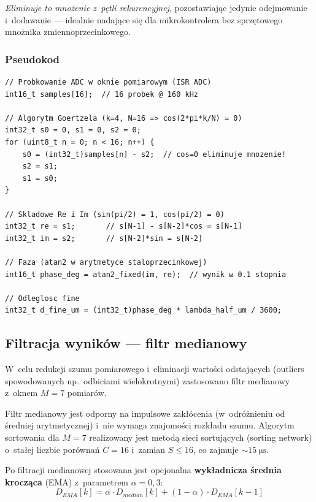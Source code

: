 \documentclass[a4paper,11pt]{article}
\begin{document}
\textit{Eliminuje to mnożenie z~pętli rekurencyjnej}, pozostawiając jedynie
odejmowanie i~dodawanie --- idealnie nadające się dla mikrokontrolera bez
sprzętowego mnożnika zmiennoprzecinkowego.

\subsubsection{Pseudokod}

\begin{lstlisting}[caption={Algorytm Goertzela --- uproszczony dla $k=4$, $N=16$},
                   label={lst:goertzel}]
// Probkowanie ADC w oknie pomiarowym (ISR ADC)
int16_t samples[16];  // 16 probek @ 160 kHz

// Algorytm Goertzela (k=4, N=16 => cos(2*pi*k/N) = 0)
int32_t s0 = 0, s1 = 0, s2 = 0;
for (uint8_t n = 0; n < 16; n++) {
    s0 = (int32_t)samples[n] - s2;  // cos=0 eliminuje mnozenie!
    s2 = s1;
    s1 = s0;
}

// Skladowe Re i Im (sin(pi/2) = 1, cos(pi/2) = 0)
int32_t re = s1;       // s[N-1] - s[N-2]*cos = s[N-1]
int32_t im = s2;       // s[N-2]*sin = s[N-2]

// Faza (atan2 w arytmetyce staloprzecinkowej)
int16_t phase_deg = atan2_fixed(im, re);  // wynik w 0.1 stopnia

// Odleglosc fine
int32_t d_fine_um = (int32_t)phase_deg * lambda_half_um / 3600;
\end{lstlisting}

\subsection{Filtracja wyników --- filtr medianowy}
\label{sec:filtr}

W~celu redukcji szumu pomiarowego i~eliminacji wartości odstających (outliers
spowodowanych np.\ odbiciami wielokrotnymi) zastosowano filtr medianowy
z~oknem $M = 7$ pomiarów.

Filtr medianowy jest odporny na impulsowe zakłócenia (w~odróżnieniu od średniej
arytmetycznej) i~nie wymaga znajomości rozkładu szumu. Algorytm sortowania
dla $M = 7$ realizowany jest metodą sieci sortujących (sorting network) o~stałej
liczbie porównań $C = 16$ i~zamian $S \leq 16$, co zajmuje ${\sim}\SI{15}{\micro\second}$.

Po filtracji medianowej stosowana jest opcjonalna \textbf{wykładnicza średnia
krocząca} (EMA) z~parametrem $\alpha = 0{,}3$:
\begin{equation}
    D_{EMA}[k] = \alpha \cdot D_{median}[k] + (1-\alpha) \cdot D_{EMA}[k-1]
    \label{eq:ema}
\end{equation}
\end{document}
